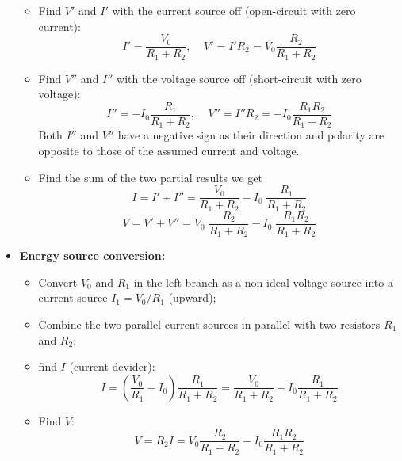 \documentclass{article}
\begin{document}
\begin{itemize}
  \begin{itemize}
  \item Find $V'$ and $I'$ with the current source off (open-circuit with 
    zero current):
    \begin{equation} 
      I'=\frac{V_0}{R_1+R_2},\;\;\;\;V'=I'R_2=V_0\frac{R_2}{R_1+R_2} 
    \end{equation}
  \item Find $V''$ and $I''$ with the voltage source off (short-circuit with 
    zero voltage):
    \begin{equation}
      I''=-I_0\frac{R_1}{R_1+R_2},\;\;\;\;V''=I''R_2=-I_0\frac{R_1R_2}{R_1+R_2} 
    \end{equation}
    Both $I''$ and $V''$ have a negative sign as their direction and polarity
    are opposite to those of the assumed current and voltage.  
  \item Find the sum of the two partial results we get
    \begin{equation}
      I=I'+I''=\frac{V_0}{R_1+R_2}-I_0\;\frac{R_1}{R_1+R_2}
    \end{equation}
    \begin{equation}
      V=V'+V''=V_0\;\frac{R_2}{R_1+R_2}-I_0\;\frac{R_1R_2}{R_1+R_2}	
    \end{equation}
  \end{itemize}
\item {\bf Energy source conversion:}

  \begin{itemize}
  \item Convert $V_0$ and $R_1$ in the left branch as a non-ideal 
    voltage source into a current source $I_1=V_0/R_1$ (upward);
  \item Combine the two parallel current sources in parallel with 
    two resistors $R_1$ and $R_2$;
  \item find $I$ (current devider):
    \begin{equation}
      I=\left(\frac{V_0}{R_1}-I_0\right)\frac{R_1}{R_1+R_2}
      =\frac{V_0}{R_1+R_2}-I_0\frac{R_1}{R_1+R_2}
    \end{equation}
  \item Find $V$:
    \begin{equation}
      V=R_2I=V_0\frac{R_2}{R_1+R_2}-I_0\frac{R_1R_2}{R_1+R_2}
    \end{equation}
  \end{itemize}


\end{itemize}
\end{document}
